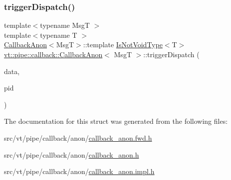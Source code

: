 \subsubsection{\texorpdfstring{trigger\+Dispatch()}{triggerDispatch()}\hspace{0.1cm}{\footnotesize\ttfamily [4/4]}}
{\footnotesize\ttfamily template$<$typename MsgT $>$ \\
template$<$typename T $>$ \\
\hyperlink{structvt_1_1pipe_1_1callback_1_1_callback_anon}{Callback\+Anon}$<$MsgT$>$\+::template \hyperlink{structvt_1_1pipe_1_1callback_1_1_callback_anon_a91e58fe2f8165c826cecedde7e4535cf}{Is\+Not\+Void\+Type}$<$T$>$ \hyperlink{structvt_1_1pipe_1_1callback_1_1_callback_anon}{vt\+::pipe\+::callback\+::\+Callback\+Anon}$<$ MsgT $>$\+::trigger\+Dispatch (\begin{DoxyParamCaption}\item[{\hyperlink{structvt_1_1pipe_1_1callback_1_1_callback_anon_ac503b95feb44bb0b60c1d69e1ed29074}{Signal\+Data\+Type} $\ast$}]{data,  }\item[{\hyperlink{namespacevt_ac9852acda74d1896f48f406cd72c7bd3}{Pipe\+Type} const \&}]{pid }\end{DoxyParamCaption})}



The documentation for this struct was generated from the following files\+:\begin{DoxyCompactItemize}
\item 
src/vt/pipe/callback/anon/\hyperlink{callback__anon_8fwd_8h}{callback\+\_\+anon.\+fwd.\+h}\item 
src/vt/pipe/callback/anon/\hyperlink{callback__anon_8h}{callback\+\_\+anon.\+h}\item 
src/vt/pipe/callback/anon/\hyperlink{callback__anon_8impl_8h}{callback\+\_\+anon.\+impl.\+h}\end{DoxyCompactItemize}
